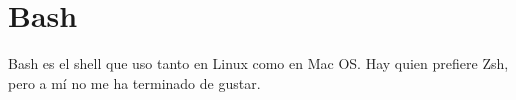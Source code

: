 \section{Bash}\label{sec:bash}
Bash es el shell que uso tanto en Linux como en Mac OS. Hay quien prefiere Zsh, pero a mí no me ha terminado de
gustar.
